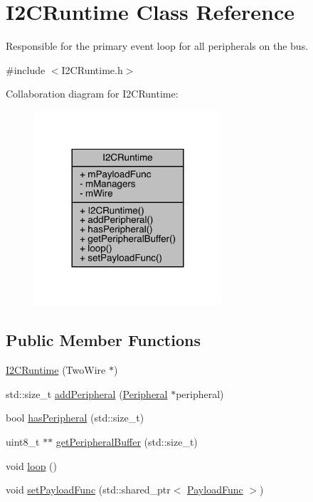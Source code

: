 \hypertarget{class_i2_c_runtime}{}\section{I2\+C\+Runtime Class Reference}
\label{class_i2_c_runtime}


Responsible for the primary event loop for all peripherals on the bus.  




{\ttfamily \#include $<$I2\+C\+Runtime.\+h$>$}



Collaboration diagram for I2\+C\+Runtime\+:\nopagebreak
\begin{figure}[H]
\begin{center}
\leavevmode
\includegraphics[width=197pt]{class_i2_c_runtime__coll__graph}
\end{center}
\end{figure}
\subsection*{Public Member Functions}
\begin{DoxyCompactItemize}
\item 
\mbox{\hyperlink{class_i2_c_runtime_aa68ca8901478720ad84ec7fb5f7f1494}{I2\+C\+Runtime}} (Two\+Wire $\ast$)
\item 
std\+::size\+\_\+t \mbox{\hyperlink{class_i2_c_runtime_aba281d78dfd704b614f0e126e9f846e5}{add\+Peripheral}} (\mbox{\hyperlink{struct_peripheral}{Peripheral}} $\ast$peripheral)
\item 
bool \mbox{\hyperlink{class_i2_c_runtime_a945f727b6d885e2c191d547b9f66f679}{has\+Peripheral}} (std\+::size\+\_\+t)
\item 
uint8\+\_\+t $\ast$$\ast$ \mbox{\hyperlink{class_i2_c_runtime_a68052a5397fdb5a1cd408d2e6ff0bac2}{get\+Peripheral\+Buffer}} (std\+::size\+\_\+t)
\item 
void \mbox{\hyperlink{class_i2_c_runtime_a7fd85af000f8d514f94c2f92db1ddfaa}{loop}} ()
\item 
void \mbox{\hyperlink{class_i2_c_runtime_a1ce8a62c677e64e8113376fc1264c6e6}{set\+Payload\+Func}} (std\+::shared\+\_\+ptr$<$ \mbox{\hyperlink{_telemetry_protocol_8h_a98c05796bd59110e8ae10dc71580b759}{Payload\+Func}} $>$)
\end{DoxyCompactItemize}
